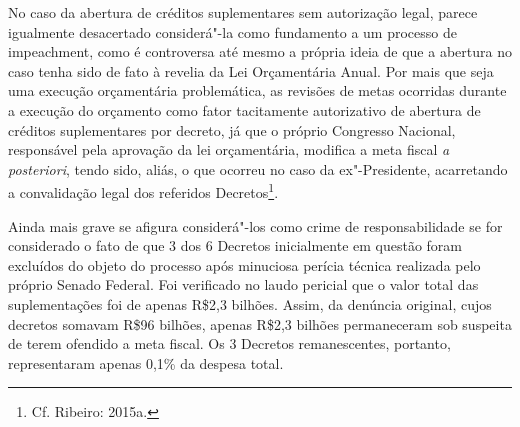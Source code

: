 No caso da abertura de créditos suplementares sem autorização legal,
parece igualmente desacertado considerá"-la como fundamento a um processo
de impeachment, como é controversa até mesmo a própria ideia de
que a abertura no caso tenha sido de fato à revelia da Lei Orçamentária
Anual. Por mais que seja uma execução orçamentária problemática, as
revisões de metas ocorridas durante a execução do orçamento como fator
tacitamente autorizativo de abertura de créditos suplementares por
decreto, já que o próprio Congresso Nacional, responsável pela aprovação
da lei orçamentária, modifica a meta fiscal \emph{a posteriori}, tendo
sido, aliás, o que ocorreu no caso da ex"-Presidente, acarretando a
convalidação legal dos referidos Decretos\footnote{Cf. Ribeiro: 2015a.}.

Ainda mais grave se afigura considerá"-los como crime de responsabilidade
se for considerado o fato de que 3 dos 6 Decretos inicialmente em
questão foram excluídos do objeto do processo após minuciosa perícia
técnica realizada pelo próprio Senado Federal. Foi verificado no laudo
pericial que o valor total das suplementações foi de apenas R\$2,3
bilhões. Assim, da denúncia original, cujos decretos somavam R\$96
bilhões, apenas R\$2,3 bilhões permaneceram sob suspeita de terem
ofendido a meta fiscal. Os 3 Decretos remanescentes, portanto,
representaram apenas 0,1\% da despesa total.

